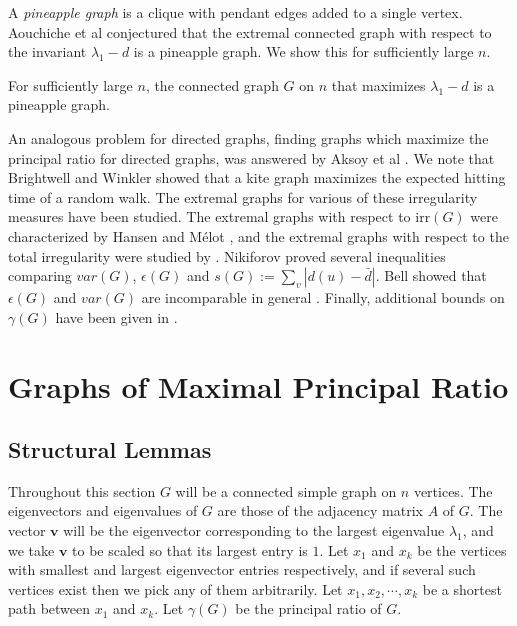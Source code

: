 A \textit{pineapple graph} is a clique with pendant edges added to a single vertex.
Aouchiche et al \cite{AouchicheEtAl2008} conjectured that the extremal connected
graph with respect to the invariant $\lambda_1 - d$ is a pineapple graph.  We
show this for sufficiently large $n$.
\begin{theorem}
  For sufficiently large $n$, the connected graph $G$ on $n$
  that maximizes $\lambda_1 - d$ is a pineapple graph.
\end{theorem}



An analogous problem for directed graphs, finding graphs which maximize the
principal ratio for directed graphs, was answered by Aksoy et al \cite{AksoyEtAl2016}.
We note that Brightwell and Winkler \cite{BrightwellWinkler1990} showed that
a kite graph maximizes the expected hitting time of a random walk.
The extremal graphs for various of these irregularity measures have been
studied.  
The extremal graphs with respect to $\textrm{irr}(G)$
were characterized by Hansen and M\'elot \cite{HansenMelot2002},
and the extremal graphs with respect to the total irregularity
were studied by \cite{Abdo2014}.
Nikiforov \cite{Nikiforov2006} proved several inequalities comparing
$var(G)$, $\epsilon(G)$ and $s(G) := \sum_v |d(u) - \bar{d}|$.  
Bell showed that $\epsilon(G)$ and $var(G)$ are incomparable in general
\cite{Bell1992}.  Finally, additional bounds on $\gamma(G)$ have been given in
\cite{CioabaGregory2007, PapendieckRecht2000, Minc1970, Latham1995, Zhang2005}.


\section{Graphs of Maximal Principal Ratio}

\subsection{Structural Lemmas}

Throughout this section $G$ will be a connected simple graph on $n$ vertices.
The eigenvectors and eigenvalues of $G$ are those of the adjacency
matrix $A$ of $G$.  The vector $\mathbf{v}$ will be the eigenvector corresponding
to the largest eigenvalue $\lambda_1$,  and we take $\mathbf{v}$ to be scaled
so that its largest entry is $1$.  Let $x_1$ and $x_k$
be the vertices with smallest and largest eigenvector entries respectively, and
if several such vertices exist then we pick any of them arbitrarily.
Let $x_1, x_2, \cdots, x_k$ be a shortest path between $x_1$ and
$x_k$.  Let $\gamma(G)$ be the principal ratio of $G$.




